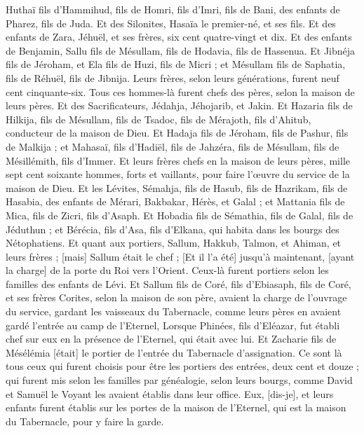 \begin{multicols}{2}
Huthaï fils d'Hammihud, fils de Homri, fils d'Imri, fils de Bani, des enfants de Pharez, fils de Juda.
Et des Silonites, Hasaïa le premier-né, et ses fils.
Et des enfants de Zara, Jéhuël, et ses frères, six cent quatre-vingt et dix.
Et des enfants de Benjamin, Sallu fils de Mésullam, fils de Hodavia, fils de Hassenua.
Et Jibnéja fils de Jéroham, et Ela fils de Huzi, fils de Micri ; et Mésullam fils de Saphatia, fils de Réhuël, fils de Jibnija.
Leurs frères, selon leurs générations, furent neuf cent cinquante-six. Tous ces hommes-là furent chefs des pères, selon la maison de leurs pères.
Et des Sacrificateurs, Jédahja, Jéhojarib, et Jakin.
Et Hazaria fils de Hilkija, fils de Mésullam, fils de Tsadoc, fils de Mérajoth, fils d'Ahitub, conducteur de la maison de Dieu.
Et Hadaja fils de Jéroham, fils de Pashur, fils de Malkija ; et Mahasaï, fils d'Hadiël, fils de Jahzéra, fils de Mésullam, fils de Mésillémith, fils d'Immer.
Et leurs frères chefs en la maison de leurs pères, mille sept cent soixante hommes, forts et vaillants, pour faire l'œuvre du service de la maison de Dieu.
Et les Lévites, Sémahja, fils de Hasub, fils de Hazrikam, fils de Hasabia, des enfants de Mérari,
Bakbakar, Hérès, et Galal ; et Mattania fils de Mica, fils de Zicri, fils d'Asaph.
Et Hobadia fils de Sémathia, fils de Galal, fils de Jéduthun ; et Bérécia, fils d'Asa, fils d'Elkana, qui habita dans les bourgs des Nétophatiens.
Et quant aux portiers, Sallum, Hakkub, Talmon, et Ahiman, et leurs frères ; [mais] Sallum était le chef ;
[Et il l'a été] jusqu'à maintenant, [ayant la charge] de la porte du Roi vers l'Orient. Ceux-là furent portiers selon les familles des enfants de Lévi.
Et Sallum fils de Coré, fils d'Ebiasaph, fils de Coré, et ses frères Corites, selon la maison de son père, avaient la charge de l'ouvrage du service, gardant les vaisseaux du Tabernacle, comme leurs pères en avaient gardé l'entrée au camp de l'Eternel,
Lorsque Phinées, fils d'Eléazar, fut établi chef sur eux en la présence de l'Eternel, qui était avec lui.
Et Zacharie fils de Mésélémia [était] le portier de l'entrée du Tabernacle d'assignation.
Ce sont là tous ceux qui furent choisis pour être les portiers des entrées, deux cent et douze ; qui furent mis selon les familles par généalogie, selon leurs bourgs, comme David et Samuël le Voyant les avaient établis dans leur office.
Eux, [dis-je], et leurs enfants furent établis sur les portes de la maison de l'Eternel, qui est la maison du Tabernacle, pour y faire la garde.

\end{multicols}

